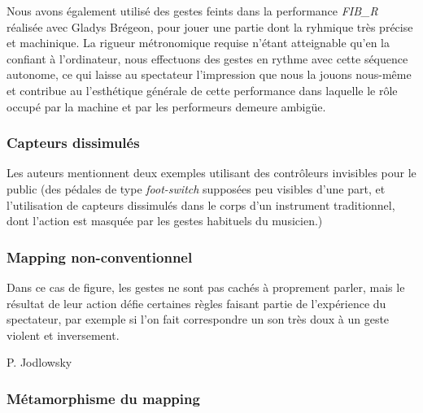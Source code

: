 \noindent Nous avons également utilisé des gestes feints dans la performance \textit{FIB\_R} réalisée avec Gladys Brégeon, pour jouer une partie dont la ryhmique très précise et machinique. La rigueur métronomique requise n'étant atteignable qu'en la confiant à l'ordinateur, nous effectuons des gestes en rythme avec cette séquence autonome, ce qui laisse au spectateur l'impression que nous la jouons nous-même et contribue au l'esthétique générale de cette performance dans laquelle le rôle occupé par la machine et par les performeurs demeure ambigüe.

\subsubsection{Capteurs dissimulés}

\noindent Les auteurs mentionnent deux exemples utilisant des contrôleurs invisibles pour le public (des pédales de type \textit{foot-switch} supposées peu visibles d'une part, et l'utilisation de capteurs dissimulés dans le corps d'un instrument traditionnel, dont l'action est masquée par les gestes habituels du musicien.)

\subsubsection{Mapping non-conventionnel}

\noindent Dans ce cas de figure, les gestes ne sont pas cachés à proprement parler, mais le résultat de leur action défie certaines règles faisant partie de l'expérience du spectateur, par exemple si l'on fait correspondre un son très doux à un geste violent et inversement.

P. Jodlowsky \cite{jodlowski_geste_2006}

\subsubsection{Métamorphisme du mapping}

